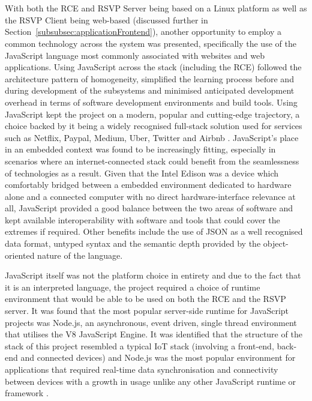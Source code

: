       \\\\
        With both the RCE and RSVP Server being based on a Linux platform as well as the RSVP Client being web-based (discussed further in Section~\ref{subsubsec:applicationFrontend}), another opportunity to employ a common technology across the system was presented, specifically the use of the JavaScript language most commonly associated with websites and web applications. Using JavaScript across the stack (including the RCE) followed the architecture pattern of homogeneity, simplified the learning process before and during development of the subsystems and minimised anticipated development overhead in terms of software development environments and build tools. Using JavaScript kept the project on a modern, popular and cutting-edge trajectory, a choice backed by it being a widely recognised full-stack solution used for services such as Netflix, Paypal, Medium, Uber, Twitter and Airbnb \cite{nodeusers_2016} \cite{driesbuytaert_2016}. JavaScript's place in an embedded context was found to be increasingly fitting, especially in scenarios where an internet-connected stack could benefit from the seamlessness of technologies as a result. Given that the Intel Edison was a device which comfortably bridged between a embedded environment dedicated to hardware alone and a connected computer with no direct hardware-interface relevance at all, JavaScript provided a good balance between the two areas of software and kept available interoperability with software and tools that could cover the extremes if required. Other benefits include the use of JSON as a well recognised data format, untyped syntax and the semantic depth provided by the object-oriented nature of the language.
        
        JavaScript itself was not the platform choice in entirety and due to the fact that it is an interpreted language, the project required a choice of runtime environment that would be able to be used on both the RCE and the RSVP server. It was found that the most popular server-side runtime for JavaScript projects was Node.js, an asynchronous, event driven, single thread environment that utilises the V8 JavaScript Engine. It was identified that the structure of the stack of this project resembled a typical IoT stack (involving a front-end, back-end and connected devices) and Node.js was the most popular environment for applications that required real-time data synchronisation and connectivity between devices with a growth in usage unlike any other JavaScript runtime or framework \cite{nodejsSurvey_2016}.
        
